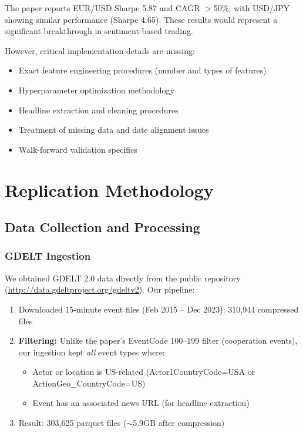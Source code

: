 \documentclass[11pt]{article}
\begin{document}
The paper reports EUR/USD Sharpe 5.87 and CAGR $>$50\%, with USD/JPY showing similar performance (Sharpe 4.65). These results would represent a significant breakthrough in sentiment-based trading.

However, critical implementation details are missing:
\begin{itemize}
    \item Exact feature engineering procedures (number and types of features)
    \item Hyperparameter optimization methodology
    \item Headline extraction and cleaning procedures
    \item Treatment of missing data and date alignment issues
    \item Walk-forward validation specifics
\end{itemize}

\section{Replication Methodology}

\subsection{Data Collection and Processing}

\subsubsection{GDELT Ingestion}

We obtained GDELT 2.0 data directly from the public repository (\url{http://data.gdeltproject.org/gdeltv2}). Our pipeline:

\begin{enumerate}
    \item Downloaded 15-minute event files (Feb 2015 -- Dec 2023): 310,944 compressed files
    \item \textbf{Filtering:} Unlike the paper's EventCode 100--199 filter (cooperation events), our ingestion kept \textit{all} event types where:
        \begin{itemize}
            \item Actor or location is US-related (Actor1CountryCode=USA or ActionGeo\_CountryCode=US)
            \item Event has an associated news URL (for headline extraction)
        \end{itemize}
    \item Result: 303,625 parquet files ($\sim$5.9GB after compression)
\end{enumerate}
\end{document}
